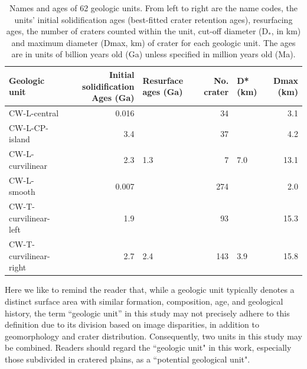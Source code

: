 \documentclass[preprint,12pt,3p,times,authoryear]{elsarticle}
\begin{document}
\begin{table}[t]%
\centering
\begin{tabular}{lrlrlr}
\hline
 Geologic unit          &   Initial solidification Ages (Ga) & Resurface ages (Ga)   &   No. crater & D* (km)   &   Dmax (km) \\
\hline
 CW-L-central           &                              0.016 &                       &           34 &           &         3.1 \\
 CW-L-CP-island         &                              3.4   &                       &           37 &           &         4.2 \\
 CW-L-curvilinear       &                              2.3   & 1.3                   &            7 & 7.0       &        13.1 \\
 CW-L-smooth            &                              0.007 &                       &          274 &           &         2.0 \\
 CW-T-curvilinear-left  &                              1.9   &                       &           93 &           &        15.3 \\
 CW-T-curvilinear-right &                              2.7   & 2.4                   &          143 & 3.9       &        15.8 \\
\hline
\end{tabular}
  \caption{Names and ages of 62 geologic units. From left to right are the name codes, the units’ initial solidification ages (best-fitted crater retention ages), resurfacing ages, the number of craters counted within the unit, cut-off diameter (D$_{*}$, in  km) and maximum diameter (Dmax, km) of crater for each geologic unit. The ages are in units of billion years old (Ga) unless specified in million years old (Ma).}
\label{tab:cpf}
\end{table}


Here we like to remind the reader that, while a geologic unit typically denotes a distinct surface area with similar formation, composition, age, and geological history, the term ``geologic unit'' in this study may not precisely adhere to this definition due to its division based on image disparities, in addition to geomorphology and crater distribution. Consequently, two units in this study may be combined. Readers should regard the ``geologic unit" in this work, especially those subdivided in cratered plains, as a ``potential geological unit".

\end{document}
